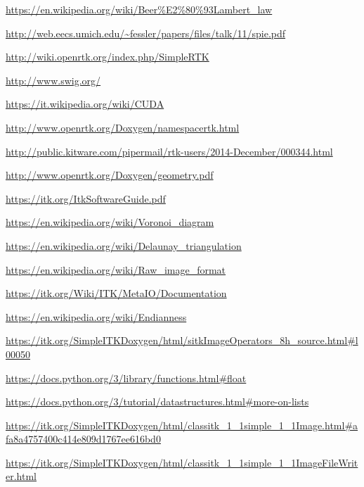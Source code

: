 \documentclass[a4paper,12pt, doubleside]{report}
\begin{document}
\begin{thebibliography}{1}
        \url{https://en.wikipedia.org/wiki/Beer%E2%80%93Lambert_law}
        
        \url{http://web.eecs.umich.edu/~fessler/papers/files/talk/11/spie.pdf}    
        
        \url{http://wiki.openrtk.org/index.php/SimpleRTK}
        
        \url{http://www.swig.org/}    
        
        \url{https://it.wikipedia.org/wiki/CUDA}
        
        \url{http://www.openrtk.org/Doxygen/namespacertk.html}
        
        \url{http://public.kitware.com/pipermail/rtk-users/2014-December/000344.html}
    
        \url{http://www.openrtk.org/Doxygen/geometry.pdf}
        
        \url{https://itk.org/ItkSoftwareGuide.pdf}   
        
        \url{https://en.wikipedia.org/wiki/Voronoi_diagram}
        
        \url{https://en.wikipedia.org/wiki/Delaunay_triangulation}
    
        \url{https://en.wikipedia.org/wiki/Raw_image_format}
    
        \url{https://itk.org/Wiki/ITK/MetaIO/Documentation} 
    
        \url{https://en.wikipedia.org/wiki/Endianness}
        
        \url{https://itk.org/SimpleITKDoxygen/html/sitkImageOperators_8h_source.html#l00050}
    
        \url{https://docs.python.org/3/library/functions.html#float}
    
        \url{https://docs.python.org/3/tutorial/datastructures.html#more-on-lists}
   
        \url{https://itk.org/SimpleITKDoxygen/html/classitk_1_1simple_1_1Image.html#afa8a4757400c414e809d1767ee616bd0}
    
        \url{https://itk.org/SimpleITKDoxygen/html/classitk_1_1simple_1_1ImageFileWriter.html}
    

\end{thebibliography}
\end{document}
